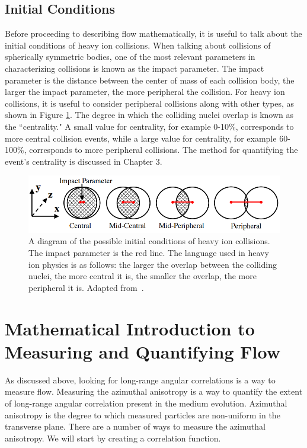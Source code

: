 \subsection{Initial Conditions}
Before proceeding to describing flow mathematically, it is useful to talk about the initial conditions of heavy ion collisions. When talking about collisions of spherically symmetric bodies, one of the most relevant parameters in characterizing collisions is known as the impact parameter. The impact parameter is the distance between the center of mass of each collision body, the larger the impact parameter, the more peripheral the collision. For heavy ion collisions, it is useful to consider peripheral collisions along with other types, as shown in Figure \ref{fig:centrality_diagram}. The degree in which the colliding nuclei overlap is known as the ``centrality." A small value for centrality, for example 0-10\%, corresponds to more central collision events, while a large value for centrality, for example 60-100\%, corresponds to more peripheral collisions. The method for quantifying the event's centrality is discussed in Chapter 3.
\begin{figure}[!ht]
\begin{center}
\includegraphics[width=0.65\linewidth]{figs/centrality_impact_parameter_diagram.PNG}
\caption{A diagram of the possible initial conditions of heavy ion collisions. The impact parameter is the red line. The language used in heavy ion physics is as follows: the larger the overlap between the colliding nuclei, the more central it is, the smaller the overlap, the more peripheral it is. Adapted from~\cite{Richardson:2012pka}.}
\label{fig:centrality_diagram}
\end{center}
\end{figure}


\section{Mathematical Introduction to Measuring and Quantifying Flow}
As discussed above, looking for long-range angular correlations is a way to measure flow. Measuring the azimuthal anisotropy is a way to quantify the extent of long-range angular correlation present in the medium evolution. Azimuthal anisotropy is the degree to which measured particles are non-uniform in the transverse plane. There are a number of ways to measure the azimuthal anisotropy. We will start by creating a correlation function. 

